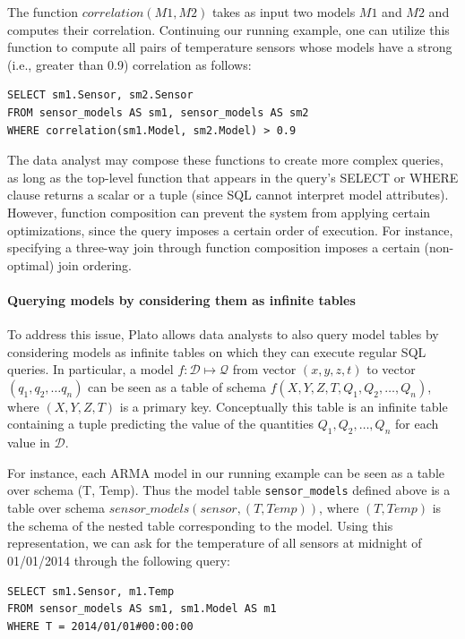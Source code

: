 \vspace*{0.5cm}
\begin{example}
The function $correlation(M1, M2)$ takes as input two models $M1$ and $M2$ and computes their correlation. Continuing our running example, one can utilize this function to compute all pairs of temperature sensors whose models have a strong (i.e., greater than 0.9) correlation as follows:
\begin{verbatim}
SELECT sm1.Sensor, sm2.Sensor
FROM sensor_models AS sm1, sensor_models AS sm2
WHERE correlation(sm1.Model, sm2.Model) > 0.9
\end{verbatim}
\end{example}
\vspace*{0.5cm}

The data analyst may compose these functions to create more complex queries, as long as the top-level function that appears in the query's SELECT or WHERE clause returns a scalar or a tuple (since SQL cannot interpret model attributes). However, function composition can prevent the system from applying certain optimizations, since the query imposes a certain order of execution. For instance, specifying a three-way join through function composition imposes a certain (non-optimal) join ordering. 

\paragraph{Querying models by considering them as infinite tables} To address this issue, Plato allows data analysts to also query model tables by considering models as infinite tables on which they can execute regular SQL queries. In particular, a model $f: \mathcal{D} \mapsto \mathcal{Q}$ from vector $(x, y, z, t)$ to vector $(q_1, q_2, \ldots q_n)$ can be seen as a table of schema $f(X, Y, Z, T, Q_1, Q_2, \ldots, Q_n)$, where $(X, Y, Z, T)$ is a primary key. Conceptually this table is an infinite table containing a tuple predicting the value of the quantities $Q_1, Q_2, \ldots, Q_n$ for each value in $\mathcal{D}$.

\vspace*{0.5cm}
\begin{example}
\label{xmpl:query-infinite-tables}
For instance, each ARMA model in our running example can be seen as a table over schema (T, Temp). Thus the model table \texttt{sensor\_models} defined above is a table over schema $sensor\_models(sensor, (T, Temp))$, where $(T, Temp)$ is the schema of the nested table corresponding to the model. Using this representation, we can ask for the temperature of all sensors at midnight of 01/01/2014 through the following query:

\begin{verbatim}
SELECT sm1.Sensor, m1.Temp
FROM sensor_models AS sm1, sm1.Model AS m1
WHERE T = 2014/01/01#00:00:00
\end{verbatim}
\end{example}
\vspace*{0.5cm}

